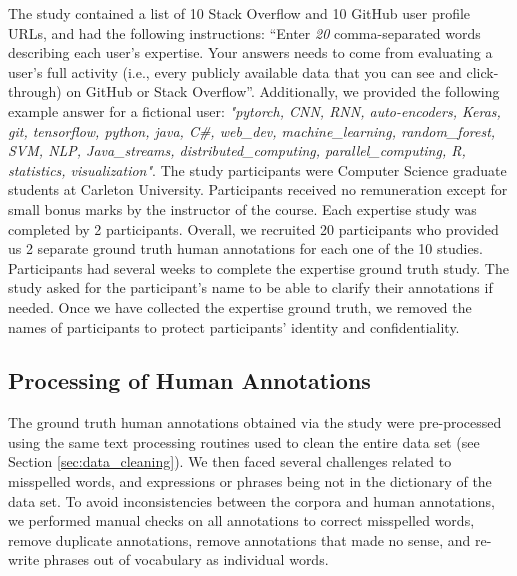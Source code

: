             The study contained a list of 10 Stack Overflow and 10 GitHub user profile URLs, and had the following instructions: ``Enter \emph{20} comma-separated words describing each user's expertise. Your answers needs to come from evaluating a user's full activity (i.e., every publicly available data that you can see and click-through) on GitHub or Stack Overflow''. Additionally, we provided the following example answer for a fictional user: \emph{"pytorch, CNN, RNN, auto-encoders, Keras, git, tensorflow, python, java, C\#, web\_dev, machine\_learning, random\_forest, SVM, NLP, Java\_streams, distributed\_computing, parallel\_computing, R, statistics, visualization"}. The study participants were Computer Science graduate students at Carleton University. Participants received no remuneration except for small bonus marks by the instructor of the course.
            Each expertise study was completed by 2 participants. Overall, we recruited 20 participants who provided us 2 separate ground truth human annotations for each one of the 10 studies. Participants had several weeks to complete the expertise ground truth study. The study asked for the participant's name to be able to clarify their annotations if needed. Once we have collected the expertise ground truth, we removed the names of participants to protect participants' identity and confidentiality.  
        
        \subsection{Processing of Human Annotations}
        
            The ground truth human annotations obtained via the study were pre-processed using the same text processing routines used to clean the entire data set (see Section \ref{sec:data_cleaning}). We then faced several challenges related to misspelled words, and expressions or phrases being not in the dictionary of the data set. To avoid inconsistencies between the corpora and human annotations, we performed manual checks on all annotations to correct misspelled words, remove duplicate annotations, remove annotations that made no sense, and re-write phrases out of vocabulary as individual words. 
            

